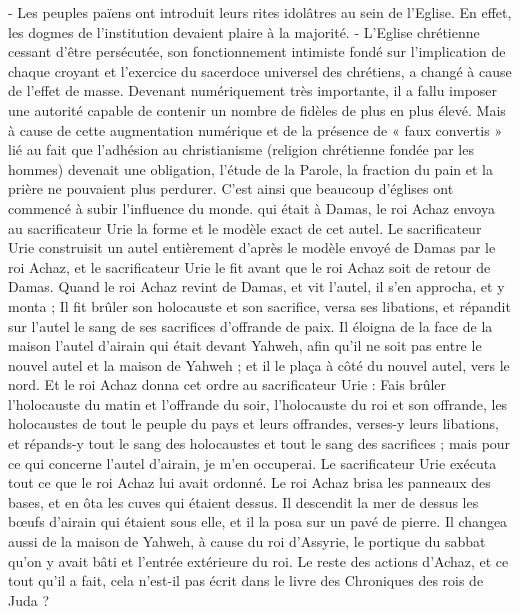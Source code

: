 \begin{multicols}{2}
{- Les peuples païens ont introduit leurs rites idolâtres au sein de l’Eglise. En effet, les dogmes de l’institution devaient plaire à la majorité.
- L’Eglise chrétienne cessant d’être persécutée, son fonctionnement intimiste fondé sur l’implication de chaque croyant et l’exercice du sacerdoce universel des chrétiens, a changé à cause de l’effet de masse. Devenant numériquement très importante, il a fallu imposer une autorité capable de contenir un nombre de fidèles de plus en plus élevé. Mais à cause de cette augmentation numérique et de la présence de « faux convertis » lié au fait que l'adhésion au christianisme (religion chrétienne fondée par les hommes) devenait une obligation, l’étude de la Parole, la fraction du pain et la prière ne pouvaient plus perdurer. C’est ainsi que beaucoup d’églises ont commencé à subir l’influence du monde.} qui était à Damas, le roi Achaz envoya au sacrificateur Urie la forme et le modèle exact de cet autel.
Le sacrificateur Urie construisit un autel entièrement d’après le modèle envoyé de Damas par le roi Achaz, et le sacrificateur Urie le fit avant que le roi Achaz soit de retour de Damas.
Quand le roi Achaz revint de Damas, et vit l’autel, il s’en approcha, et y monta ;
Il fit brûler son holocauste et son sacrifice, versa ses libations, et répandit sur l’autel le sang de ses sacrifices d’offrande de paix.
Il éloigna de la face de la maison l’autel d’airain qui était devant Yahweh, afin qu’il ne soit pas entre le nouvel autel et la maison de Yahweh ; et il le plaça à côté du nouvel autel, vers le nord.
Et le roi Achaz donna cet ordre au sacrificateur Urie : Fais brûler l’holocauste du matin et l’offrande du soir, l’holocauste du roi et son offrande, les holocaustes de tout le peuple du pays et leurs offrandes, verses-y leurs libations, et répands-y tout le sang des holocaustes et tout le sang des sacrifices ; mais pour ce qui concerne l’autel d’airain, je m’en occuperai.
Le sacrificateur Urie exécuta tout ce que le roi Achaz lui avait ordonné.
Le roi Achaz brisa les panneaux des bases, et en ôta les cuves qui étaient dessus. Il descendit la mer de dessus les bœufs d’airain qui étaient sous elle, et il la posa sur un pavé de pierre.
Il changea aussi de la maison de Yahweh, à cause du roi d’Assyrie, le portique du sabbat qu’on y avait bâti et l’entrée extérieure du roi.
Le reste des actions d’Achaz, et ce tout qu’il a fait, cela n’est-il pas écrit dans le livre des Chroniques des rois de Juda ?

\end{multicols}
